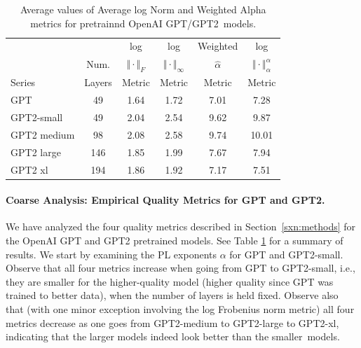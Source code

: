 \begin{table}[t]
\small
\begin{center}
\begin{tabular}{|p{0.75in}|c|c|c|c|c|}
\hline
        &        & log                   & log                        & Weighted       & log                                 \\
        & Num.   & $\Vert\cdot\Vert_{F}$ & $\Vert\cdot\Vert_{\infty}$ & $\hat{\alpha}$ & $\Vert\cdot\Vert^{\alpha}_{\alpha}$ \\
 Series & Layers & Metric                & Metric                     & Metric         & Metric                              \\
\hline
GPT & 49 & 1.64  & 1.72 & 7.01 & 7.28 \\
GPT2-small & 49 & 2.04  & 2.54& 9.62 & 9.87 \\
\hline
GPT2 medium & 98 & 2.08 & 2.58& 9.74 & 10.01 \\
GPT2 large & 146 & 1.85 & 1.99& 7.67 & 7.94 \\
GPT2 xl & 194 & 1.86 & 1.92 & 7.17 & 7.51 \\
\hline
\end{tabular}
\end{center}
\caption{Average values of Average log Norm and Weighted Alpha metrics for pretrainnd OpenAI GPT/GPT2~models.}
\label{table:nlp}
\end{table}


\paragraph{Coarse Analysis: Empirical Quality Metrics for GPT and GPT2.}

We have analyzed the four quality metrics described in Section~\ref{sxn:methods} for the OpenAI GPT and GPT2 pretrained models.
See Table \ref{table:nlp} for a summary of results.
We start by examining the PL exponents $\alpha$ for GPT and GPT2-small.
Observe that all four metrics increase when going from GPT to GPT2-small, i.e., they are smaller for the higher-quality model (higher quality since GPT was trained to better data), when the number of layers is held fixed.
Observe also that (with one minor exception involving the log Frobenius norm metric) all four metrics decrease as one goes from GPT2-medium to GPT2-large to GPT2-xl, indicating that the larger models indeed look better than the smaller~models.

